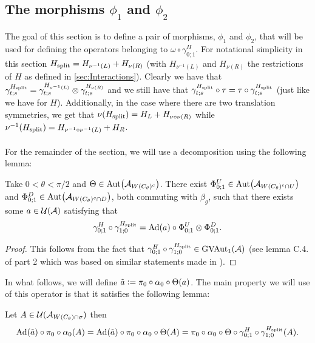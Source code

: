 \documentclass[11pt,a4paper,twoside]{article}
\numberwithin{equation}{section}
\begin{document}
	\subsection{The morphisms \texorpdfstring{$\phi_1$}{} and \texorpdfstring{$\phi_2$}{}}
	The goal of this section is to define a pair of morphisms, $\phi_1$ and $\phi_2$, that will be used for defining the operators belonging to $\omega\circ\gamma^H_{0;1}$. For notational simplicity in this section ${H_{\text{split}}}=H_{\nu^{-1}(L)}+H_{\nu(R)}$ (with $H_{\nu^{-1}(L)}$ and $H_{\nu(R)}$ the restrictions of $H$ as defined in \ref{sec:Interactions}). Clearly we have that $\gamma^{{H_{\text{split}}}}_{t;s}=\gamma^{H_{\nu^{-1}(L)}}_{t;s}\otimes\gamma^{H_{\nu(R)}}_{t;s}$ and we still have that $\gamma^{{H_{\text{split}}}}_{t;s}\circ\tau=\tau\circ\gamma^{{H_{\text{split}}}}_{t;s}$ (just like we have for $H$). Additionally, in the case where there are two translation symmetries, we get that $\nu({H_{\text{split}}})=H_L+H_{\nu\circ\nu(R)}$ while $\nu^{-1}({H_{\text{split}}})=H_{\nu^{-1}\circ\nu^{-1}(L)}+H_{R}$.\\\\
	For the remainder of the section, we will use a decomposition using the following lemma:
	\begin{lemma}\label{lem:DefinitionOfGroupMorphismVAutEquation}
		Take $0<\theta<\pi/2$ and $\Theta\in \Aut{\AA_{W(C_\theta)^c}}$. There exist $\Phi^U_{0;1}\in\Aut{\AA_{W(C_\theta)^c\cap U}}$ and $\Phi^D_{0;1}\in\Aut{\AA_{W(C_\theta)^c\cap D}}$, both commuting with $\beta_g$, such that there exists some $a\in\mathcal U(\mathcal A)$ satisfying that
		\begin{equation}\label{eq:DefinitionOfGroupMorphismVAutEquation}
			\gamma^H_{0;1}\circ\gamma^{\Hsplit}_{1;0}=\Ad{a}\circ \Phi^U_{0;1}\otimes\Phi^D_{0;1}.
		\end{equation}
	\end{lemma}
	\begin{proof}
		This follows from the fact that $\gamma^H_{0;1}\circ\gamma^{{H_{\text{split}}}}_{1;0}\in \textrm{GVAut}_1(\mathcal A)$ (see lemma C.4. of \cite{jappens2023spt} part 2 which was based on similar statements made in \cite{ogata2021h3gmathbb}).
	\end{proof}
	In what follows, we will define $\tilde{a}\vcentcolon= \pi_0\circ\alpha_0\circ\Theta(a)$. The main property we will use of this operator is that it satisfies the following lemma:
	\begin{lemma}\label{lem:PropertyTilde_a}
		Let $A\in\mathcal U(\mathcal A_{W(C_\theta)\cap\sigma})$ then
		\begin{equation}
			\Ad{\tilde{a}}\circ\pi_0\circ\alpha_0(A)=\Ad{\tilde{a}}\circ\pi_0\circ\alpha_0\circ\Theta(A)=\pi_0\circ\alpha_0\circ\Theta\circ\gamma^H_{0;1}\circ\gamma^{\Hsplit}_{1;0}(A).
		\end{equation}
	\end{lemma}
\end{document}
